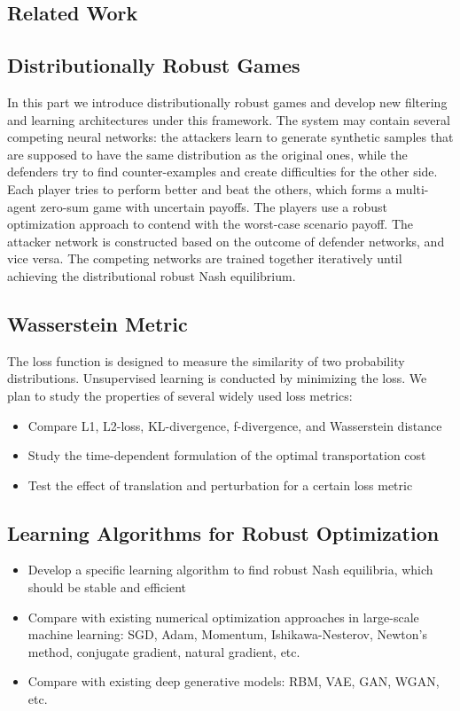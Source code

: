 \documentclass{article}
\begin{document}
\subsection{Related Work}

\subsection{Distributionally Robust Games}
In this part we introduce distributionally robust games and develop new filtering and learning architectures under this framework. The system may contain several competing neural networks: the attackers learn to generate synthetic samples that are supposed to have the same distribution as the original ones, while the defenders try to find counter-examples and create difficulties for the other side. Each player tries to perform better and beat the others, which forms a multi-agent zero-sum game with uncertain payoffs. The players use a robust optimization approach to contend with the worst-case scenario payoff. The attacker network is constructed based on the outcome of defender networks, and vice versa. The competing networks are trained together iteratively until achieving the distributional robust Nash equilibrium.

\subsection{Wasserstein Metric}
The loss function is designed to measure the similarity of two probability distributions. Unsupervised learning is conducted by minimizing the loss. We plan to study the properties of several widely used loss metrics:
\begin{itemize}
\item Compare L1, L2-loss, KL-divergence, f-divergence, and Wasserstein distance
\item Study the time-dependent formulation of the optimal transportation cost
\item Test the effect of translation and perturbation for a certain loss metric
\end{itemize}

\subsection{Learning Algorithms for Robust Optimization}
\begin{itemize}
\item Develop a specific learning algorithm to find robust Nash equilibria, which should be stable and efficient
\item Compare with existing numerical optimization approaches in large-scale machine learning: SGD, Adam, Momentum, Ishikawa-Nesterov, Newton's method, conjugate gradient, natural gradient, etc.
\item Compare with existing deep generative models: RBM, VAE, GAN, WGAN, etc.
\end{itemize}
\end{document}
